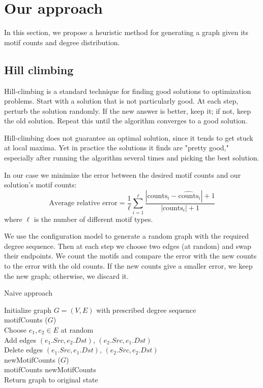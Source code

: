 \section{Our approach}
\label{sec:approach-hillclimbing}

In this section, we propose a heuristic method for generating a graph given its motif counts and degree distribution.

\subsection{Hill climbing}
Hill-climbing is a standard technique for finding good solutions to optimization problems.  Start with a solution that is not particularly good.  At each step, perturb the solution randomly.  If the new answer is better, keep it; if not, keep the old solution.  Repeat this until the algorithm converges to a good solution.

Hill-climbing does not guarantee an optimal solution, since it tends to get stuck at local maxima.  Yet in practice the solutions it finds are "pretty good," especially after running the algorithm several times and picking the best solution.

In our case we minimize the error between the desired motif counts and our solution's motif counts:
\begin{equation}
\label{eqn:avgRelativeError}
\mbox{Average relative error} = \frac{1}{\ell} \sum_{i = 1}^{\ell} \frac{|\mbox{counts}_i - \widehat{\mbox{counts}}_i| + 1}{|\mbox{counts}_i| + 1}
\end{equation}
where $\ell$ is the number of different motif types.

We use the configuration model to generate a random graph with the required degree sequence.  Then at each step we choose two edges (at random) and swap their endpoints.  We count the motifs and compare the error with the new counts to the error with the old counts.  If the new counts give a smaller error, we keep the new graph; otherwise, we discard it.

\begin{algorithm}[t]
\caption{Naive approach}
\label{algorithm:naive}
\begin{algorithmic}
Initialize graph $G = (V, E)$ with prescribed degree sequence\\
motifCounts \leftarrow {}($G$)\\
 {
	Choose $e_1, e_2 \in E$ at random\\
	Add edges $(e_1.Src, e_2.Dst)$, $(e_2.Src, e_1.Dst)$\\
	Delete edges $(e_1.Src, e_1.Dst)$, $(e_2.Src, e_2.Dst)$\\
	newMotifCounts \leftarrow {}($G$)\\
	 {
		motifCounts \leftarrow newMotifCounts\\
	} {
		Return graph to original state\\
	}
}

\end{algorithmic}
\end{algorithm}

